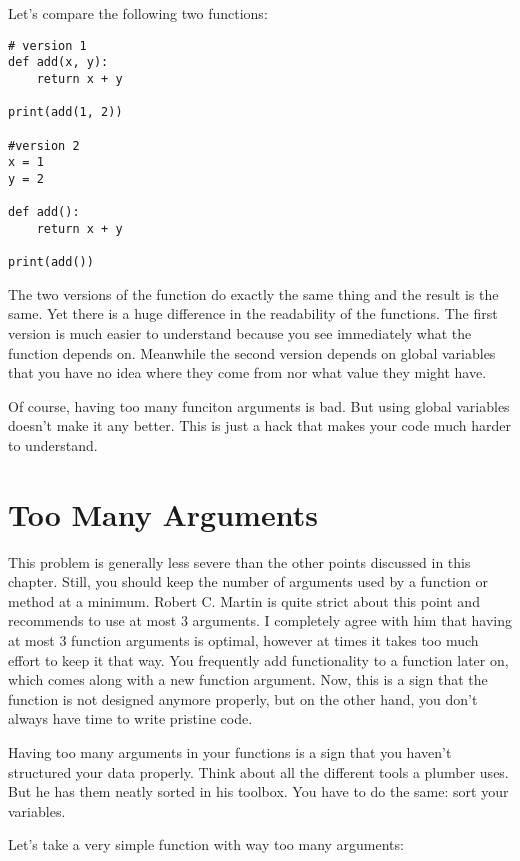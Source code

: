 Let's compare the following two functions:

\begin{programcode}{}
\begin{verbatim}
# version 1
def add(x, y):
    return x + y

print(add(1, 2))

#version 2
x = 1
y = 2

def add():
    return x + y

print(add())
\end{verbatim}
\end{programcode}

The two versions of the  function do exactly the same thing and the result is the same. Yet there is a huge difference in the readability of the functions. The first version is much easier to understand because you see immediately what the function depends on. Meanwhile the second version depends on global variables that you have no idea where they come from nor what value they might have.

Of course, having too many funciton arguments is bad. But using global variables doesn't make it any better. This is just a hack that makes your code much harder to understand.

\section{Too Many Arguments}

This problem is generally less severe than the other points discussed in this chapter. Still, you should keep the number of arguments used by a function or method at a minimum. Robert C. Martin is quite strict about this point and recommends to use at most 3 arguments. I completely agree with him that having at most 3 function arguments is optimal, however at times it takes too much effort to keep it that way. You frequently add functionality to a function later on, which comes along with a new function argument. Now, this is a sign that the function is not designed anymore properly, but on the other hand, you don't always have time to write pristine code.

Having too many arguments in your functions is a sign that you haven't structured your data properly. Think about all the different tools a plumber uses. But he has them neatly sorted in his toolbox. You have to do the same: sort your variables.

Let's take a very simple function with way too many arguments:

